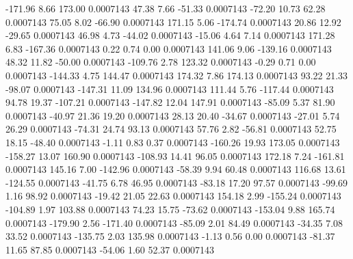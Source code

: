      -171.96        8.66      173.00     0.0007143
       47.38        7.66      -51.33     0.0007143
      -72.20       10.73       62.28     0.0007143
       75.05        8.02      -66.90     0.0007143
      171.15        5.06     -174.74     0.0007143
       20.86       12.92      -29.65     0.0007143
       46.98        4.73      -44.02     0.0007143
      -15.06        4.64        7.14     0.0007143
      171.28        6.83     -167.36     0.0007143
        0.22        0.74        0.00     0.0007143
      141.06        9.06     -139.16     0.0007143
       48.32       11.82      -50.00     0.0007143
     -109.76        2.78      123.32     0.0007143
       -0.29        0.71        0.00     0.0007143
     -144.33        4.75      144.47     0.0007143
      174.32        7.86      174.13     0.0007143
       93.22       21.33      -98.07     0.0007143
     -147.31       11.09      134.96     0.0007143
      111.44        5.76     -117.44     0.0007143
       94.78       19.37     -107.21     0.0007143
     -147.82       12.04      147.91     0.0007143
      -85.09        5.37       81.90     0.0007143
      -40.97       21.36       19.20     0.0007143
       28.13       20.40      -34.67     0.0007143
      -27.01        5.74       26.29     0.0007143
      -74.31       24.74       93.13     0.0007143
       57.76        2.82      -56.81     0.0007143
       52.75       18.15      -48.40     0.0007143
       -1.11        0.83        0.37     0.0007143
     -160.26       19.93      173.05     0.0007143
     -158.27       13.07      160.90     0.0007143
     -108.93       14.41       96.05     0.0007143
      172.18        7.24     -161.81     0.0007143
      145.16        7.00     -142.96     0.0007143
      -58.39        9.94       60.48     0.0007143
      116.68       13.61     -124.55     0.0007143
      -41.75        6.78       46.95     0.0007143
      -83.18       17.20       97.57     0.0007143
      -99.69        1.16       98.92     0.0007143
      -19.42       21.05       22.63     0.0007143
      154.18        2.99     -155.24     0.0007143
     -104.89        1.97      103.88     0.0007143
       74.23       15.75      -73.62     0.0007143
     -153.04        9.88      165.74     0.0007143
     -179.90        2.56     -171.40     0.0007143
      -85.09        2.01       84.49     0.0007143
      -34.35        7.08       33.52     0.0007143
     -135.75        2.03      135.98     0.0007143
       -1.13        0.56        0.00     0.0007143
      -81.37       11.65       87.85     0.0007143
      -54.06        1.60       52.37     0.0007143
